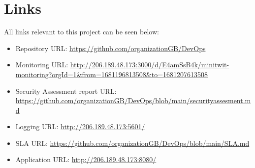 \newpage
\section{Links}
All links relevant to this project can be seen below:
\begin{itemize}
    \item Repository URL: \url{https://github.com/organizationGB/DevOps}
    \item Monitoring URL: \url{http://206.189.48.173:3000/d/E4amSsB4k/minitwit-monitoring?orgId=1&from=1681196813508&to=1681207613508}
    \item Security Assessment report URL: \url{https://github.com/organizationGB/DevOps/blob/main/securityassesment.md}
    \item Logging URL: \url{http://206.189.48.173:5601/}
    \item SLA URL: \url{https://github.com/organizationGB/DevOps/blob/main/SLA.md}
    \item Application URL: \url{http://206.189.48.173:8080/}
\end{itemize}